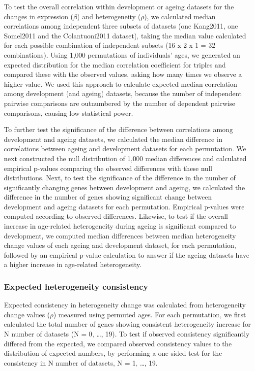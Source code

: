 \documentclass[12pt,twoside]{unicam}
\begin{document}
To test the overall correlation within development or ageing datasets for the changes in expression (\(\beta\)) and heterogeneity (\(\rho\)), we calculated median correlations among independent three subsets of datasets (one Kang2011, one Somel2011 and the Colantuoni2011 dataset), taking the median value calculated for each possible combination of independent subsets (16 x 2 x 1 = 32 combinations). Using 1,000 permutations of individuals' ages, we generated an expected distribution for the median correlation coefficient for triples and compared these with the observed values, asking how many times we observe a higher value. We used this approach to calculate expected median correlation among development (and ageing) datasets, because the number of independent pairwise comparisons are outnumbered by the number of dependent pairwise comparisons, causing low statistical power.

To further test the significance of the difference between correlations among development and ageing datasets, we calculated the median difference in correlations between ageing and development datasets for each permutation. We next constructed the null distribution of 1,000 median differences and calculated empirical p-values comparing the observed differences with these null distributions. Next, to test the significance of the difference in the number of significantly changing genes between development and ageing, we calculated the difference in the number of genes showing significant change between development and ageing datasets for each permutation. Empirical p-values were computed according to observed differences. Likewise, to test if the overall increase in age-related heterogeneity during ageing is significant compared to development, we computed median differences between median heterogeneity change values of each ageing and development dataset, for each permutation, followed by an empirical p-value calculation to answer if the ageing datasets have a higher increase in age-related heterogeneity.

\hypertarget{expected-heterogeneity-consistency}{%
\subsubsection{Expected heterogeneity consistency}\label{expected-heterogeneity-consistency}}

Expected consistency in heterogeneity change was calculated from heterogeneity change values (\(\rho\)) measured using permuted ages. For each permutation, we first calculated the total number of genes showing consistent heterogeneity increase for N number of datasets (N = 0, \ldots, 19). To test if observed consistency significantly differed from the expected, we compared observed consistency values to the distribution of expected numbers, by performing a one-sided test for the consistency in N number of datasets, N = 1, \ldots, 19.
\end{document}
